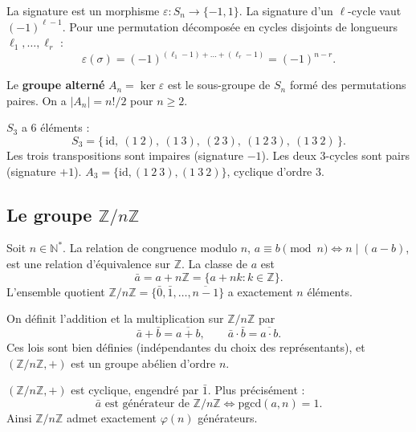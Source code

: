 \begin{proposition}
La signature est un morphisme $\varepsilon : S_n \to \{-1, 1\}$. La signature d'un $\ell$-cycle vaut $(-1)^{\ell-1}$. Pour une permutation décomposée en cycles disjoints de longueurs $\ell_1, \dots, \ell_r$ :
\[ \varepsilon(\sigma) = (-1)^{(\ell_1 - 1) + \dots + (\ell_r - 1)} = (-1)^{n - r}. \]
\end{proposition}

\begin{definition}
Le \textbf{groupe alterné} $A_n = \ker \varepsilon$ est le sous-groupe de $S_n$ formé des permutations paires. On a $|A_n| = n!/2$ pour $n \ge 2$.
\end{definition}

\begin{exemple}[$S_3$]
$S_3$ a $6$ éléments :
\[ S_3 = \{\,\mathrm{id},\ (1\ 2),\ (1\ 3),\ (2\ 3),\ (1\ 2\ 3),\ (1\ 3\ 2)\,\}. \]
Les trois transpositions sont impaires (signature $-1$). Les deux $3$-cycles sont pairs (signature $+1$). $A_3 = \{\mathrm{id}, (1\ 2\ 3), (1\ 3\ 2)\}$, cyclique d'ordre $3$.
\end{exemple}

\subsection{Le groupe $\mathbb{Z}/n\mathbb{Z}$}

\begin{definition}
Soit $n \in \mathbb{N}^*$. La relation de congruence modulo $n$, $a \equiv b \pmod{n} \iff n \mid (a - b)$, est une relation d'équivalence sur $\mathbb{Z}$. La classe de $a$ est
\[ \bar{a} = a + n\mathbb{Z} = \{a + nk : k \in \mathbb{Z}\}. \]
L'ensemble quotient $\mathbb{Z}/n\mathbb{Z} = \{\bar{0}, \bar{1}, \dots, \overline{n-1}\}$ a exactement $n$ éléments.
\end{definition}

\begin{proposition}
On définit l'addition et la multiplication sur $\mathbb{Z}/n\mathbb{Z}$ par
\[ \bar{a} + \bar{b} = \overline{a + b}, \qquad \bar{a} \cdot \bar{b} = \overline{a \cdot b}. \]
Ces lois sont bien définies (indépendantes du choix des représentants), et $(\mathbb{Z}/n\mathbb{Z}, +)$ est un groupe abélien d'ordre $n$.
\end{proposition}

\begin{theoreme}
$(\mathbb{Z}/n\mathbb{Z}, +)$ est cyclique, engendré par $\bar{1}$. Plus précisément :
\[ \bar{a} \text{ est générateur de } \mathbb{Z}/n\mathbb{Z} \iff \mathrm{pgcd}(a, n) = 1. \]
Ainsi $\mathbb{Z}/n\mathbb{Z}$ admet exactement $\varphi(n)$ générateurs.
\end{theoreme}


